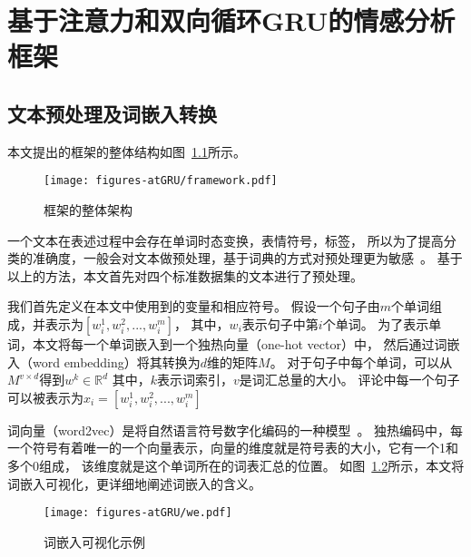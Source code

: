 
\chapter{基于注意力和双向循环GRU的情感分析框架}

\section{文本预处理及词嵌入转换}
本文提出的框架的整体结构如图~\ref{fig:fig1}所示。
\begin{figure}[h!]
	\centering
	\texttt{[image: figures-atGRU/framework.pdf]}
	\caption{框架的整体架构}
	\label{fig:fig1}
\end{figure}

一个文本在表述过程中会存在单词时态变换，表情符号，标签，
所以为了提高分类的准确度，一般会对文本做预处理，基于词典的方式对预处理更为敏感~。
基于以上的方法，本文首先对四个标准数据集的文本进行了预处理。

我们首先定义在本文中使用到的变量和相应符号。
假设一个句子由${m}$个单词组成，并表示为${\left[w_{i}^{1},w_{i}^{2},...,w_{i}^{m}\right]}$，
其中，${w_{i}}$表示句子中第${i}$个单词。
为了表示单词，本文将每一个单词嵌入到一个独热向量（one-hot vector）中，
然后通过词嵌入（word embedding）将其转换为${d}$维的矩阵${M}$。
对于句子中每个单词，可以从${M^{v\times d}}$得到${w^{k}\in \mathbb{R}^{d}}$
其中，${k}$表示词索引，${v}$是词汇总量的大小。
评论中每一个句子可以被表示为${x_{i}=\left[w_{i}^{1},w_{i}^{2},...,w_{i}^{m}\right]}$

词向量（word2vec）是将自然语言符号数字化编码的一种模型~。
独热编码中，每一个符号有着唯一的一个向量表示，向量的维度就是符号表的大小，它有一个1和多个0组成，
该维度就是这个单词所在的词表汇总的位置。
如图~\ref{fig:we}所示，本文将词嵌入可视化，更详细地阐述词嵌入的含义。
\begin{figure}[h!]
	\centering
	\texttt{[image: figures-atGRU/we.pdf]}
	\caption{词嵌入可视化示例}
	\label{fig:we}
\end{figure}

